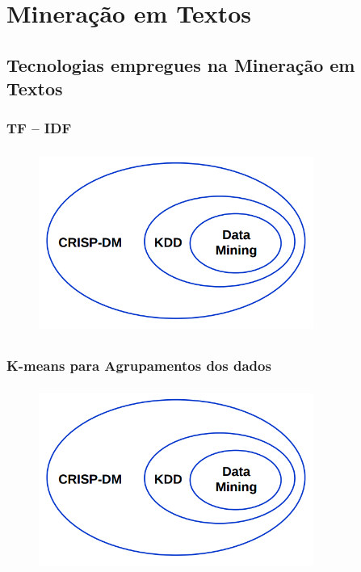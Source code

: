 \documentclass[11pt]{beamer}
\begin{document}
\section{ Mineração em Textos}
\subsection*{ Tecnologias empregues na Mineração em Textos}

\begin{frame}\frametitle{ TF -- IDF}
	\transdissolve[duration=2, direction=25]
	\begin{figure}[!ht]
		\includegraphics[width=90mm, height=60mm]{Figuras/BigData/RelacaoCrispKddDm.png}
	\end{figure}
\end{frame}


\begin{frame}\frametitle{ K-means para Agrupamentos dos dados}
	\transdissolve[duration=2, direction=25]
	\begin{figure}[!ht]
		\includegraphics[width=90mm, height=60mm]{Figuras/BigData/RelacaoCrispKddDm.png}
	\end{figure}
\end{frame}

\end{document}
